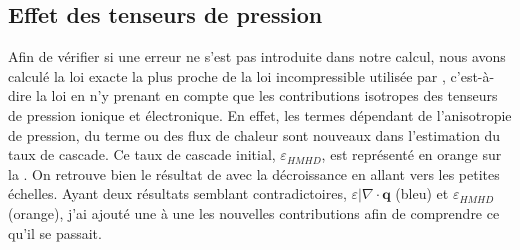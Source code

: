 \subsection{Effet des tenseurs de pression}
Afin de vérifier si une erreur ne s'est pas introduite dans notre calcul, nous avons calculé la loi exacte la plus proche de la loi incompressible utilisée par \cite{ferrand_fluid_2021}, c'est-à-dire la loi  en n'y prenant en compte que les contributions isotropes des tenseurs de pression ionique et électronique. En effet, les termes dépendant de l'anisotropie de pression, du terme  ou des flux de chaleur sont nouveaux dans l'estimation du taux de cascade. Ce taux de cascade initial, $\varepsilon_{HMHD}$, est représenté en orange sur la . On retrouve bien le résultat de \cite{ferrand_fluid_2021} avec la décroissance en allant vers les petites échelles. Ayant deux résultats semblant contradictoires, $\varepsilon|\nabla \cdot \boldsymbol{q}$ (bleu) et $\varepsilon_{HMHD}$ (orange), j'ai ajouté une à une les nouvelles contributions afin de comprendre ce qu'il se passait. 

